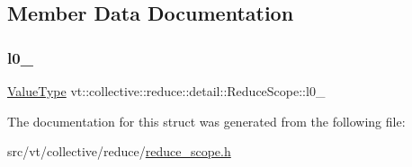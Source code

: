 \subsection{Member Data Documentation}
\mbox{\label{structvt_1_1collective_1_1reduce_1_1detail_1_1_reduce_scope_ab0e1e9603e220a5ad22e2b664ddcf050}} 
\subsubsection{\texorpdfstring{l0\+\_\+}{l0\_}}
{\footnotesize\ttfamily \hyperlink{structvt_1_1collective_1_1reduce_1_1detail_1_1_reduce_scope_aac14cd07e9678d96b761d90aa1ed3bb0}{Value\+Type} vt\+::collective\+::reduce\+::detail\+::\+Reduce\+Scope\+::l0\+\_\+\hspace{0.3cm}{\ttfamily [private]}}



The documentation for this struct was generated from the following file\+:\begin{DoxyCompactItemize}
\item 
src/vt/collective/reduce/\hyperlink{reduce__scope_8h}{reduce\+\_\+scope.\+h}\end{DoxyCompactItemize}
